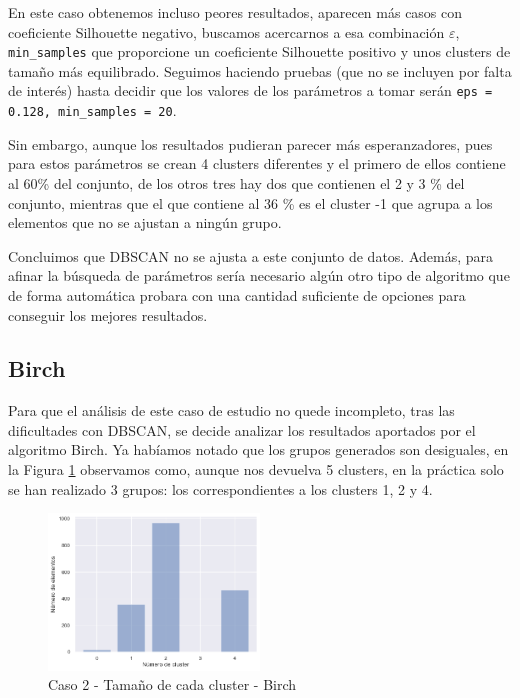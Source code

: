 \documentclass[a4paper, 20pt]{article}
\begin{document}
En este caso obtenemos incluso peores resultados, aparecen más casos con coeficiente Silhouette negativo, buscamos acercarnos a esa combinación $\varepsilon$, \texttt{min\_samples} que proporcione un coeficiente Silhouette positivo y unos clusters de tamaño más equilibrado. Seguimos haciendo pruebas (que no se incluyen por falta de interés) hasta decidir que los valores de los parámetros a tomar serán \texttt{eps = 0.128, min\_samples = 20}.

Sin embargo, aunque los resultados pudieran parecer más esperanzadores, pues para estos parámetros se crean 4 clusters diferentes y el primero de ellos contiene al 60\% del conjunto, de los otros tres hay dos que contienen el 2 y 3 \% del conjunto, mientras que el que contiene al 36 \% es el cluster -1 que agrupa a los elementos que no se ajustan a ningún grupo.

Concluimos que DBSCAN no se ajusta a este conjunto de datos. Además, para afinar la búsqueda de parámetros sería necesario algún otro tipo de algoritmo que de forma automática probara con una cantidad suficiente de opciones para conseguir los mejores resultados.

\subsection{Birch}
Para que el análisis de este caso de estudio no quede incompleto, tras las dificultades con DBSCAN, se decide analizar los resultados aportados por el algoritmo Birch. Ya habíamos notado que los grupos generados son desiguales, en la Figura \ref{fig:birch_tam2} observamos como, aunque nos devuelva 5 clusters, en la práctica solo se han realizado 3 grupos: los correspondientes a los clusters 1, 2 y 4.

\begin{figure}[H]
    \centering
    \includegraphics[width=0.5\textwidth]{./caso2/Birch_tam_clusters}
    \caption{Caso 2 - Tamaño de cada cluster - Birch}
    \label{fig:birch_tam2}
\end{figure}
\end{document}
